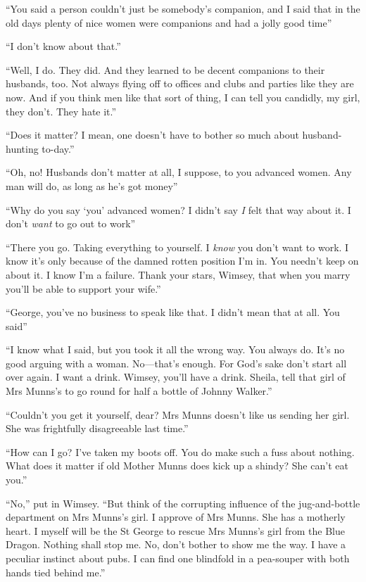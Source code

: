 \enquote{You said a person couldn't just be somebody's companion, and I said that in the old days plenty of nice women were companions and had a jolly good time\longdash}

\enquote{I don't know about that.}

\enquote{Well, I do. They did. And they learned to be decent companions to their husbands, too. Not always flying off to offices and clubs and parties like they are now. And if you think men like that sort of thing, I can tell you candidly, my girl, they don't. They hate it.}

\enquote{Does it matter? I mean, one doesn't have to bother so much about husband-hunting to-day.}

\enquote{Oh, no! Husbands don't matter at all, I suppose, to you advanced women. Any man will do, as long as he's got money\longdash}

\enquote{Why do you say \enquote{you} advanced women? I didn't say \textit{I} felt that way about it. I don't \textit{want} to go out to work\longdash}

\enquote{There you go. Taking everything to yourself. I \textit{know} you don't want to work. I know it's only because of the damned rotten position I'm in. You needn't keep on about it. I know I'm a failure. Thank your stars, Wimsey, that when you marry you'll be able to support your wife.}

\enquote{George, you've no business to speak like that. I didn't mean that at all. You said\longdash}

\enquote{I know what I said, but you took it all the wrong way. You always do. It's no good arguing with a woman. No\allowbreak---\allowbreak that's enough. For God's sake don't start all over again. I want a drink. Wimsey, you'll have a drink. Sheila, tell that girl of Mrs Munns's to go round for half a bottle of Johnny Walker.}

\enquote{Couldn't you get it yourself, dear? Mrs Munns doesn't like us sending her girl. She was frightfully disagreeable last time.}

\enquote{How can I go? I've taken my boots off. You do make such a fuss about nothing. What does it matter if old Mother Munns does kick up a shindy? She can't eat you.}

\enquote{No,} put in Wimsey. \enquote{But think of the corrupting influence of the jug-and-bottle department on Mrs Munns's girl. I approve of Mrs Munns. She has a motherly heart. I myself will be the St George to rescue Mrs Munns's girl from the Blue Dragon. Nothing shall stop me. No, don't bother to show me the way. I have a peculiar instinct about pubs. I can find one blindfold in a pea-souper with both hands tied behind me.}

